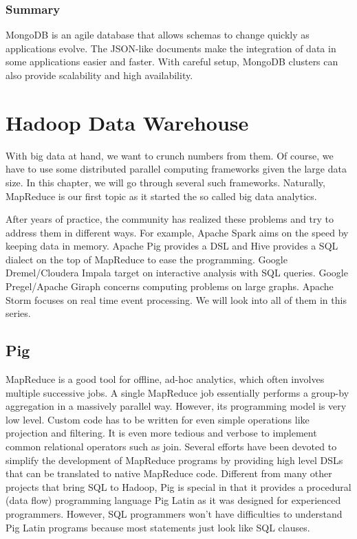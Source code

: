 \documentclass[11pt]{book}
\begin{document}
\subsection{Summary}
MongoDB is an agile database that allows schemas to change quickly as applications evolve. The JSON-like documents make the integration of data in some applications easier and faster. With careful setup, MongoDB clusters can also provide scalability and high availability.



\chapter[Hadoop Data Warehouse]
{Hadoop Data Warehouse}
With big data at hand, we want to crunch numbers from them. Of course, we have to use some distributed parallel computing frameworks given the large data size. In this chapter, we will go through several such frameworks. Naturally, MapReduce is our first topic as it started the so called big data analytics.

After years of practice, the community has realized these problems and try to address them in different ways. For example, Apache Spark aims on the speed by keeping data in memory. Apache Pig provides a DSL and Hive provides a SQL dialect on the top of MapReduce to ease the programming. Google Dremel/Cloudera Impala target on interactive analysis with SQL queries. Google Pregel/Apache Giraph concerns computing problems on large graphs. Apache Storm focuses on real time event processing. We will look into all of them in this series.

\section{Pig}
MapReduce is a good tool for offline, ad-hoc analytics, which often involves multiple successive jobs. A single MapReduce job essentially performs a group-by aggregation in a massively parallel way. However, its programming model is very low level. Custom code has to be written for even simple operations like projection and filtering. It is even more tedious and verbose to implement common relational operators such as join. Several efforts have been devoted to simplify the development of MapReduce programs by providing high level DSLs that can be translated to native MapReduce code. Different from many other projects that bring SQL to Hadoop, Pig is special in that it provides a procedural (data flow) programming language Pig Latin as it was designed for experienced programmers. However, SQL programmers won't have difficulties to understand Pig Latin programs because most statements just look like SQL clauses.
\end{document}
